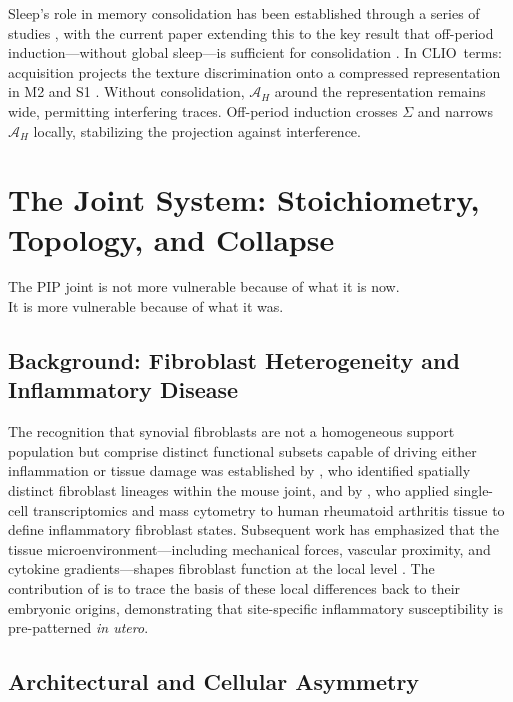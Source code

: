 \documentclass[12pt, a4paper, twoside]{book}
\theoremstyle{definition}
\theoremstyle{remark}
\newcommand{\Adm}{\mathcal{A}}
\newcommand{\CLIO}{\textsf{CLIO}}
\begin{document}
Sleep's role in memory consolidation has been established through a series of studies \citep{miyamoto2016, huber2004}, with the current paper extending this to the key result that off-period induction---without global sleep---is sufficient for consolidation \citep{driessen2026}. In \CLIO\ terms: acquisition projects the texture discrimination onto a compressed representation in M2 and S1 \citep{miyamoto2016}. Without consolidation, $\Adm_H$ around the representation remains wide, permitting interfering traces. Off-period induction crosses $\Sigma$ and narrows $\Adm_H$ locally, stabilizing the projection against interference.

\chapter{The Joint System: Stoichiometry, Topology, and Collapse}
\label{ch:arthritis}

\epigraph{The PIP joint is not more vulnerable because of what it is now.\\
  It is more vulnerable because of what it was.}{}

\section{Background: Fibroblast Heterogeneity and Inflammatory Disease}

The recognition that synovial fibroblasts are not a homogeneous support population but comprise distinct functional subsets capable of driving either inflammation or tissue damage was established by \citet{croft2019}, who identified spatially distinct fibroblast lineages within the mouse joint, and by \citet{zhang2019}, who applied single-cell transcriptomics and mass cytometry to human rheumatoid arthritis tissue to define inflammatory fibroblast states. Subsequent work has emphasized that the tissue microenvironment---including mechanical forces, vascular proximity, and cytokine gradients---shapes fibroblast function at the local level \citep{buckley2019}. The contribution of \citet{davidson2026} is to trace the basis of these local differences back to their embryonic origins, demonstrating that site-specific inflammatory susceptibility is pre-patterned \emph{in utero}.

\section{Architectural and Cellular Asymmetry}
\end{document}
